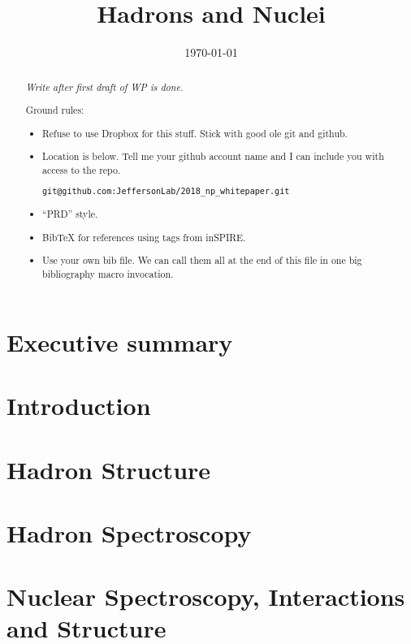 \documentclass[aps,prd,nofootinbib,floatfix,superscriptaddress,preprint,tightenlines]{revtex4-1}
\begin{document}
\title{Hadrons and Nuclei}
\noaffiliation

\date{\today}
%
\begin{abstract}
\emph{Write after first draft of WP is done.}
    
Ground rules:
\begin{itemize}
    \item Refuse to use Dropbox for this stuff. Stick with good ole git and github.
    \item Location is below. Tell me your github account name and I
      can include you with access to the repo.
\begin{verbatim}git@github.com:JeffersonLab/2018_np_whitepaper.git\end{verbatim}
  \item ``PRD'' style.
  \item BibTeX for references using tags from inSPIRE.
  \item Use your own bib file. We can call them all at the end of this
    file in one big bibliography macro invocation.
\end{itemize}

\end{abstract}

\maketitle

\section{Executive summary}


\newpage
\tableofcontents

\section{Introduction}


\section{Hadron Structure}


\section{Hadron Spectroscopy}


\section{Nuclear Spectroscopy, Interactions and Structure}


\begin{figure}
    \vspace*{3cm}
\end{figure}



\end{document}
